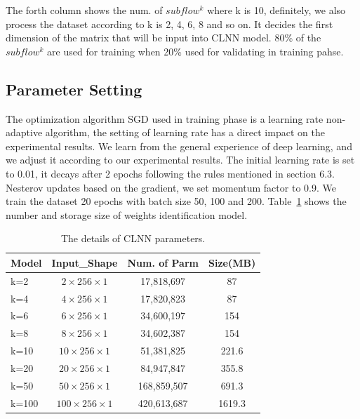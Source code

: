 \documentclass[conference]{IEEEtran}
\begin{document}
The forth column shows the num. of $subflow^k$ where k is 10, definitely, we also process the dataset according to k is 2, 4, 6, 8 and so on. It decides the first dimension of the matrix that will be input into CLNN model. 80\% of the $subflow^k$ are used for training when 20\% used for validating in training pahse.

\subsection{Parameter Setting}
\label{sec:params}

The optimization algorithm SGD used in training phase is a learning rate non-adaptive algorithm, the setting of learning rate has a direct impact on the experimental results. We learn from the general experience of deep learning, and we adjust it according to our experimental results. The initial learning rate is set to 0.01, it decays after 2 epochs following the rules mentioned in section 6.3. Nesterov updates based on the gradient, we set momentum factor to 0.9. We train the dataset 20 epochs with batch size 50, 100 and 200. Table~\ref{tab:params} shows the number and storage size of weights identification model.
\begin{table}
  \caption{The details of CLNN parameters.}
  \label{tab:params}
  \centering
  \begin{tabular}{l c c c}
    \hline
    \textbf{Model} & \textbf{Input\_Shape} & \textbf{Num. of Parm}&\textbf{Size(MB)}\\
    \hline
    k=2      & ${2 \times 256 \times 1}$  & 17,818,697  &87  \\
    k=4      & ${4 \times 256 \times 1}$  & 17,820,823  &87  \\
    k=6      & ${6 \times 256 \times 1}$  & 34,600,197  &154  \\
    k=8      & ${8 \times 256 \times 1}$  & 34,602,387  &154 \\
    k=10     & ${10 \times 256 \times 1}$  & 51,381,825  &221.6  \\
    k=20     & ${20 \times 256 \times 1}$  & 84,947,847  &355.8 \\
    k=50     & ${50 \times 256 \times 1}$  & 168,859,507  &691.3  \\
    k=100    & ${100 \times 256 \times 1}$  & 420,613,687  &1619.3  \\
    \hline
  \end{tabular}
\end{table}
\end{document}
